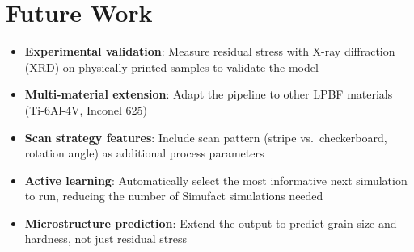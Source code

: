 \documentclass[12pt,a4paper]{report}
\begin{document}
\section{Future Work}

\begin{itemize}
  \item \textbf{Experimental validation}: Measure residual stress with X-ray diffraction (XRD) on physically printed samples to validate the model
  \item \textbf{Multi-material extension}: Adapt the pipeline to other LPBF materials (Ti-6Al-4V, Inconel 625)
  \item \textbf{Scan strategy features}: Include scan pattern (stripe vs.\ checkerboard, rotation angle) as additional process parameters
  \item \textbf{Active learning}: Automatically select the most informative next simulation to run, reducing the number of Simufact simulations needed
  \item \textbf{Microstructure prediction}: Extend the output to predict grain size and hardness, not just residual stress
\end{itemize}
\end{document}
